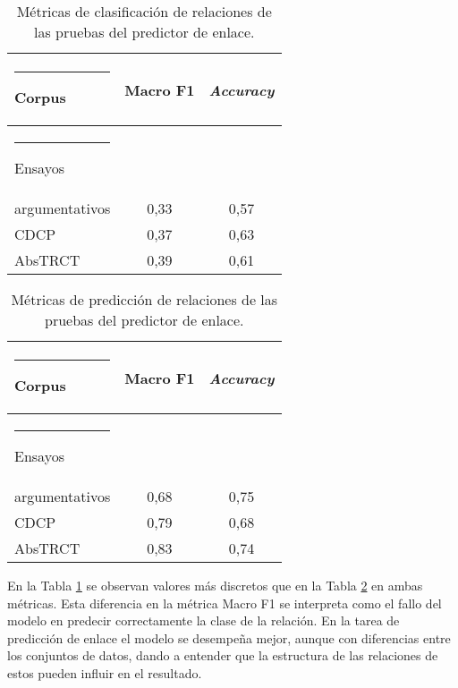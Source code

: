 \documentclass[a4paper,11pt,twocolumn,twoside]{article}
\begin{document}
\begin{table}[h]
	\begin{center}
		\begin{tabular}{|l|c|c|} 
			\hline\rule{-2pt}{15pt}
			{\bf Corpus}                 & {\bf Macro F1} & {\bf \textit{Accuracy}} \\
			\hline\rule{-4pt}{10pt}
			Ensayos				 		 & 				  & 						\\ 
			argumentativos 		 		 & 0,33			  & 0,57					\\ 
			CDCP                   		 & 0,37			  & 0,63					\\ 
			AbsTRCT               		 & 0,39			  & 0,61					\\ 
			\hline
		\end{tabular}
	\end{center}
	\caption{\label{table:test_relation_metrics_link_predictor_relation_classification}Métricas de clasificación de relaciones de las pruebas del predictor de enlace.}
\end{table}

\begin{table}[h]
	\begin{center}
		\begin{tabular}{|l|c|c|} 
			\hline\rule{-2pt}{15pt}
			{\bf Corpus}                 & {\bf Macro F1}  & {\bf \textit{Accuracy}} \\
			\hline\rule{-4pt}{10pt}
			Ensayos 			 		 & 	               & 	                    \\ 
			argumentativos 				 & 0,68            & 0,75                   \\ 
			CDCP                   		 & 0,79            & 0,68                   \\ 
			AbsTRCT               		 & 0,83            & 0,74                   \\ 
			\hline
		\end{tabular}
	\end{center}
	\caption{\label{table:test_relation_metrics_link_predictor_link_prediction}Métricas de predicción de relaciones de las pruebas del predictor de enlace.}
\end{table}

En la Tabla \ref{table:test_relation_metrics_link_predictor_relation_classification} se observan
valores más discretos que en la Tabla \ref{table:test_relation_metrics_link_predictor_link_prediction}
en ambas métricas. Esta diferencia en la métrica Macro F1 se interpreta como el fallo del modelo 
en predecir correctamente la clase de la relación. En la tarea de predicción de 
enlace el modelo se desempeña mejor, aunque con diferencias entre los conjuntos de datos, 
dando a entender que la estructura de las relaciones de estos pueden influir en el resultado.
\end{document}
